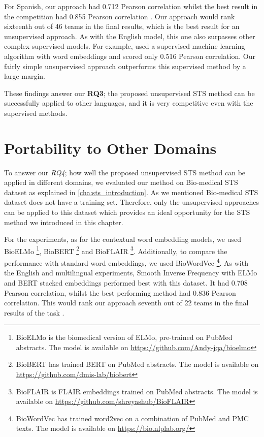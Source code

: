 For Spanish, our approach had 0.712 Pearson correlation whilst the best result \autocite{tian-etal-2017-ecnu} in the competition had 0.855 Pearson correlation \autocite{cer-etal-2017-semeval}. Our approach would rank sixteenth out of 46 teams in the final results, which is the best result for an unsupervised approach. As with the English model, this one also surpasses other complex supervised models. For example, \textcite{barrow-peskov-2017-umdeep} used a supervised machine learning algorithm with word embeddings and scored only 0.516 Pearson correlation. Our fairly simple unsupervised approach outperforms this supervised method by a large margin. 

These findings answer our \textbf{RQ3}; the proposed unsupervised STS method can be successfully applied to other languages, and it is very competitive even with the supervised methods. 


\section{Portability to Other Domains}
\label{sec:state_domains}
To answer our \textit{RQ4}; how well the proposed unsupervised STS method can be applied in different domains, we evaluated our method on Bio-medical STS dataset as explained in \ref{cha:sts_introduction}. As we mentioned Bio-medical STS dataset does not have a training set. Therefore, only the unsupervised approaches can be applied to this dataset which provides an ideal opportunity for the STS method we introduced in this chapter. 

For the experiments, as for the contextual word embedding models, we used BioELMo \autocite{jin2019probing}\footnote{BioELMo is the biomedical version of ELMo, pre-trained on PubMed abstracts. The model is available on \url{https://github.com/Andy-jqa/bioelmo}}, BioBERT \autocite{10.1093/bioinformatics/btz682}\footnote{BioBERT has trained BERT on PubMed abstracts. The model is available on \url{https://github.com/dmis-lab/biobert}} and BioFLAIR \autocite{sharma2019bioflair}\footnote{BioFLAIR is FLAIR embeddings trained on PubMed abstracts. The model is available on \url{https://github.com/shreyashub/BioFLAIR}}. Additionally, to compare the performance with standard word embeddings, we used BioWordVec \autocite{Zhang2019}\footnote{BioWordVec has trained word2vec on a combination of PubMed and PMC texts. The model is available on \url{https://bio.nlplab.org/}}. As with the English and multilingual experiments, Smooth Inverse Frequency with ELMo and BERT stacked embeddings performed best with this dataset. It had 0.708 Pearson correlation, whilst the best performing method had 0.836 Pearson correlation. This would rank our approach seventh out of 22 teams in the final results of the task \autocite{10.1093/bioinformatics/btx238}.

